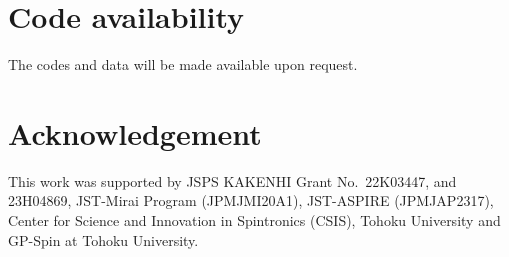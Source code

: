 \documentclass[preprint,12pt]{elsarticle}
\begin{document}
\section{Code availability}
The codes and data will be made available upon request.

\section{Acknowledgement}
This work was supported by
JSPS KAKENHI Grant No.\ 22K03447, and 23H04869,
JST-Mirai Program (JPMJMI20A1),
JST-ASPIRE (JPMJAP2317),
Center for Science and Innovation in Spintronics (CSIS),
Tohoku University and GP-Spin at Tohoku University.



\end{document}
